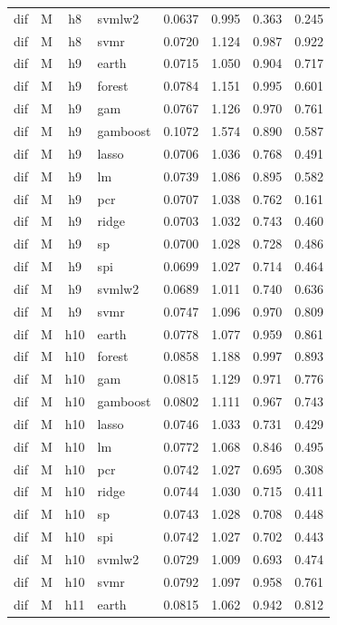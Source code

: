 \begin{ThreePartTable}
\begin{longtable}[t]{llclcccc}
dif & M & h8 & svmlw2 & 0.0637 & 0.995 & 0.363 & 0.245\\
dif & M & h8 & svmr & 0.0720 & 1.124 & 0.987 & 0.922\\
\addlinespace
dif & M & h9 & earth & 0.0715 & 1.050 & 0.904 & 0.717\\
dif & M & h9 & forest & 0.0784 & 1.151 & 0.995 & 0.601\\
dif & M & h9 & gam & 0.0767 & 1.126 & 0.970 & 0.761\\
dif & M & h9 & gamboost & 0.1072 & 1.574 & 0.890 & 0.587\\
dif & M & h9 & lasso & 0.0706 & 1.036 & 0.768 & 0.491\\
dif & M & h9 & lm & 0.0739 & 1.086 & 0.895 & 0.582\\
dif & M & h9 & pcr & 0.0707 & 1.038 & 0.762 & 0.161\\
dif & M & h9 & ridge & 0.0703 & 1.032 & 0.743 & 0.460\\
dif & M & h9 & sp & 0.0700 & 1.028 & 0.728 & 0.486\\
dif & M & h9 & spi & 0.0699 & 1.027 & 0.714 & 0.464\\
dif & M & h9 & svmlw2 & 0.0689 & 1.011 & 0.740 & 0.636\\
dif & M & h9 & svmr & 0.0747 & 1.096 & 0.970 & 0.809\\
\addlinespace
dif & M & h10 & earth & 0.0778 & 1.077 & 0.959 & 0.861\\
dif & M & h10 & forest & 0.0858 & 1.188 & 0.997 & 0.893\\
dif & M & h10 & gam & 0.0815 & 1.129 & 0.971 & 0.776\\
dif & M & h10 & gamboost & 0.0802 & 1.111 & 0.967 & 0.743\\
dif & M & h10 & lasso & 0.0746 & 1.033 & 0.731 & 0.429\\
dif & M & h10 & lm & 0.0772 & 1.068 & 0.846 & 0.495\\
dif & M & h10 & pcr & 0.0742 & 1.027 & 0.695 & 0.308\\
dif & M & h10 & ridge & 0.0744 & 1.030 & 0.715 & 0.411\\
dif & M & h10 & sp & 0.0743 & 1.028 & 0.708 & 0.448\\
dif & M & h10 & spi & 0.0742 & 1.027 & 0.702 & 0.443\\
dif & M & h10 & svmlw2 & 0.0729 & 1.009 & 0.693 & 0.474\\
dif & M & h10 & svmr & 0.0792 & 1.097 & 0.958 & 0.761\\
\addlinespace
dif & M & h11 & earth & 0.0815 & 1.062 & 0.942 & 0.812\\

\end{longtable}
\end{ThreePartTable}
